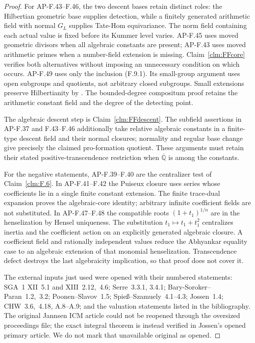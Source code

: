 \documentclass[11pt]{article}
\begin{document}
\begin{proof}
For AP-F.43--F.46, the two descent bases retain distinct roles:
the Hilbertian geometric base supplies detection, while a finitely
generated arithmetic field with normal \(G_L\) supplies
Tate-Hom equivariance. The norm field containing each actual value
is fixed before its Kummer level varies. AP-F.45 uses moved
geometric divisors when all algebraic constants are present;
AP-F.43 uses moved arithmetic primes when a number-field extension
is missing. Claim~\ref{clm:FFcore} verifies both alternatives
without imposing an unnecessary condition on which occurs.
AP-F.49 uses only the inclusion (F.9.1). Its small-group argument
uses open subgroups and quotients, not arbitrary closed subgroups.
Small extensions preserve Hilbertianity by
\citet[Theorem~4.4]{FF_BarySoroker2008}. The bounded-degree
compositum proof retains the arithmetic constant field and the
degree of the detecting point.

The algebraic descent step is Claim~\ref{clm:FFdescent}.
The subfield assertions in AP-F.37 and F.43--F.46 additionally
take relative algebraic constants in a finite-type descent field
and their normal closures; normality and regular base change
give precisely the claimed pro-formation quotient. These arguments
must retain their stated positive-transcendence restriction when
\(\overline{\mathbb Q}\) is among the constants.

For the negative statements, AP-F.39--F.40 are the centralizer
test of Claim~\ref{clm:F.6}. In AP-F.41--F.42 the Puiseux
closure uses series whose coefficients lie in a single finite
constant extension. The finite trace-dual expansion proves the
algebraic-core identity; arbitrary infinite coefficient fields
are not substituted. In AP-F.47--F.48 the compatible roots
\((1+t_1)^{1/n}\) are in the henselization by Hensel uniqueness.
The substitution \(t_1\mapsto t_1+t_1^2\) centralizes inertia
and the coefficient action on an explicitly generated algebraic
closure. A coefficient field and rationally independent values
reduce the Abhyankar equality case to an algebraic extension of
that monomial henselization. Transcendence defect destroys the
last algebraicity implication, so that proof does not cover it.

The external inputs just used were opened with their numbered
statements: SGA~1 XII~5.1 and XIII~2.12,~4.6; Serre~3.3.1,
3.4.1; Bary-Soroker--Paran~1.2,~3.2; Poonen--Slavov~1.5;
Spie\ss--Szamuely~4.1--4.3; Jossen~1.4; CHW~3.6,~4.18,
A.8--A.9; and the valuation statements listed in the bibliography.
The original Jannsen ICM article could not be reopened through
the oversized proceedings file; the exact integral theorem is
instead verified in Jossen's opened primary article. We do not
mark that unavailable original as opened.
\end{proof}
\end{document}
